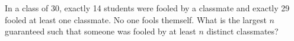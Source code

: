 In a class of 30, exactly 14 students were fooled by a classmate and exactly 29 fooled at least one classmate. No one fools themself. What is the largest $n$ guaranteed such that someone was fooled by at least $n$ distinct classmates?
